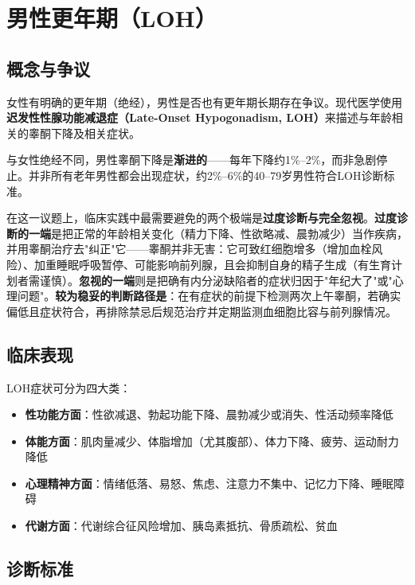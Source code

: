 \documentclass[12pt,a4paper,twoside]{ctexbook}
\begin{document}
\section{男性更年期（LOH）}

\label{sec:male_menopause}

\subsection{概念与争议}

女性有明确的更年期（绝经），男性是否也有更年期长期存在争议。现代医学使用\textbf{迟发性性腺功能减退症（Late-Onset Hypogonadism, LOH）}来描述与年龄相关的睾酮下降及相关症状。

与女性绝经不同，男性睾酮下降是\textbf{渐进的}——每年下降约1\%--2\%，而非急剧停止。并非所有老年男性都会出现症状，约2\%--6\%的40--79岁男性符合LOH诊断标准。


在这一议题上，临床实践中最需要避免的两个极端是\textbf{过度诊断与完全忽视}。\textbf{过度诊断的一端}是把正常的年龄相关变化（精力下降、性欲略减、晨勃减少）当作疾病，并用睾酮治疗去"纠正"它——睾酮并非无害：它可致红细胞增多（增加血栓风险）、加重睡眠呼吸暂停、可能影响前列腺，且会抑制自身的精子生成（有生育计划者需谨慎）。\textbf{忽视的一端}则是把确有内分泌缺陷者的症状归因于"年纪大了"或"心理问题"。\textbf{较为稳妥的判断路径是}：在有症状的前提下检测两次上午睾酮，若确实偏低且症状符合，再排除禁忌后规范治疗并定期监测血细胞比容与前列腺情况。

\subsection{临床表现}

LOH症状可分为四大类：

\begin{itemize}[leftmargin=2cm]
	\item \textbf{性功能方面}：性欲减退、勃起功能下降、晨勃减少或消失、性活动频率降低
	\item \textbf{体能方面}：肌肉量减少、体脂增加（尤其腹部）、体力下降、疲劳、运动耐力降低
	\item \textbf{心理精神方面}：情绪低落、易怒、焦虑、注意力不集中、记忆力下降、睡眠障碍
	\item \textbf{代谢方面}：代谢综合征风险增加、胰岛素抵抗、骨质疏松、贫血
\end{itemize}

\subsection{诊断标准}
\end{document}
